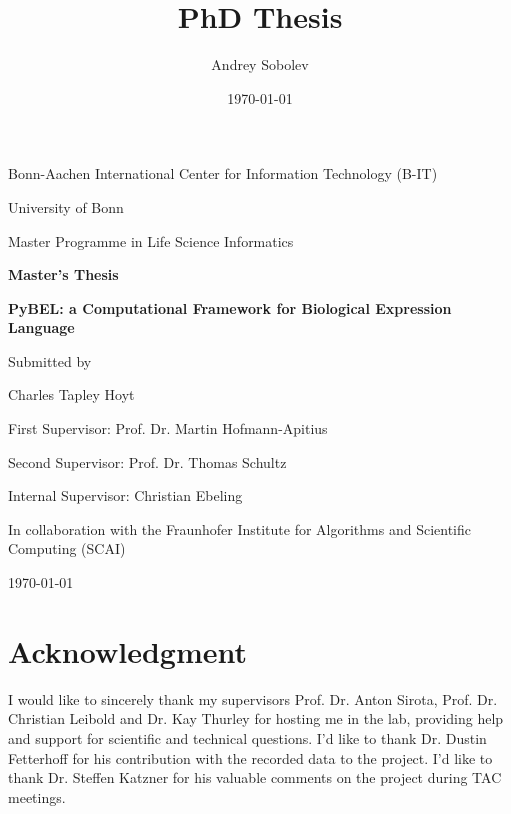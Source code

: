\documentclass[twoside, 12pt,  footinclude=true,  headinclude=true,  cleardoublepage=empty]{scrbook}
\title{PhD Thesis}
\author{Andrey Sobolev}
\date{\today}
\begin{document}
	\begin{titlepage}
		\centering
		Bonn-Aachen International Center for Information Technology (B-IT)

		University of Bonn

		 Master Programme in Life Science Informatics

		\vspace{1in}
		 {\Large \bfseries Master's Thesis}
		\vspace{1in}

		{\LARGE \bfseries PyBEL: a Computational Framework for Biological Expression Language}
		\vspace{1in}

		{\large Submitted by}

		{\LARGE Charles Tapley Hoyt\par}

		\vspace{1in}

			First Supervisor: Prof. Dr. Martin Hofmann-Apitius
			\par
			Second Supervisor: Prof. Dr. Thomas Schultz
			\par
			Internal Supervisor: Christian Ebeling

		\vfill
		In collaboration with the Fraunhofer Institute for Algorithms and Scientific Computing (SCAI)
		\begin{flushleft}
			\today
		\end{flushleft}

	\end{titlepage}



	\frontmatter

\chapter*{Acknowledgment}

\begingroup
\setlength{\parskip}{1em}

I would like to sincerely thank my supervisors Prof. Dr. Anton Sirota, Prof. Dr. Christian Leibold and Dr. Kay Thurley for hosting me in the lab, providing help and support for scientific and technical questions. I'd like to thank Dr. Dustin Fetterhoff for his contribution with the recorded data to the project. I'd like to thank Dr. Steffen Katzner for his valuable comments on the project during TAC meetings.
\end{document}
